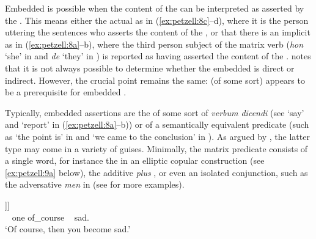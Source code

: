 \documentclass[output=paper,colorlinks,citecolor=brown,draft,draftmode]{langscibook}
\begin{document}
Embedded  is possible when the content of the  can be interpreted as asserted by the  \citep[21]{Andersson1975}. This means either the actual  as in (\ref{ex:petzell:8c}–d), where it is the person uttering the sentences who asserts the content of the , or that there is an implicit  as in (\ref{ex:petzell:8a}–b), where the third person subject of the matrix verb (\textit{hon} ‘she’ in  and \textit{de} ‘they’ in ) is reported as having asserted the content of the . \citet[164–167]{Julien2015} notes that it is not always possible to determine whether the embedded  is direct or indirect. However, the crucial point remains the same:   (of some sort) appears to be a prerequisite for embedded .\largerpage



Typically, embedded assertions are the  of some sort of \textit{verbum dicendi} (see ‘say’ and ‘report’ in (\ref{ex:petzell:8a}–b)) or of a semantically equivalent predicate (such as ‘the point is’ in  and ‘we came to the conclusion’ in ). As argued by \citet{Julien2009}, the latter type may come in a variety of guises. Minimally, the matrix predicate consists of a single word, for instance the   in an elliptic copular construction (see \ref{ex:petzell:9a} below), the additive  \textit{plus} , or even an isolated conjunction, such as the adversative \textit{men} in  (see \citealt{Lyngfelt2003} for more examples).


\ea\label{ex:petzell:9}
\ea{\label{ex:petzell:9a}
\gll (Det  är)         klart [\textsubscript{CP}  att [\textsubscript{CP}  då      \textit{{blir}}\textsubscript{v}\\
    it        be.\textsc{prs}    clear ~   that ~   then  become.\textsc{prs}      \\}

]]  \\
        ~   one     of\_course ~  sad.\\
\glt `Of course, then you become sad.’  \\
\end{document}
